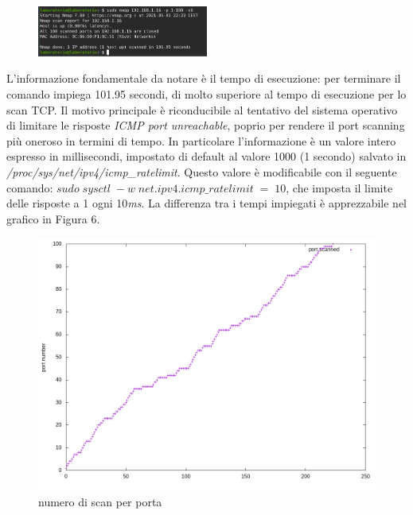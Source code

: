 \documentclass{article}
\begin{document}
\begin{figure} %
  \centering
  \includegraphics[width=0.5\textwidth]{Servizi attivi su vm con udp.png}
\end{figure}

L'informazione fondamentale da notare è il tempo di esecuzione: per terminare
il comando impiega 101.95 secondi, di molto superiore al tempo di esecuzione 
per lo scan TCP. Il motivo principale è riconducibile al tentativo del sistema 
operativo di limitare le risposte \textit{ICMP port unreachable}, poprio per 
rendere il port scanning più oneroso in termini di tempo. In particolare 
l'informazione è un valore intero espresso in millisecondi, impostato di
default al valore 1000 (1 secondo) salvato in \textit{/proc/sys/net/ipv4/icmp\_ratelimit}. Questo valore è modificabile con 
il seguente comando: $sudo\; sysctl\; -w\; net.ipv4.icmp\_ratelimit\;=\;10$, che imposta 
il limite delle risposte a 1 ogni 10\textit{ms}. La differenza tra i 
tempi impiegati è apprezzabile nel grafico in Figura 6. \\

\begin{figure} %
  \centering
  \includegraphics[width=1\linewidth]{vm_udp_num_test.png}  
  \caption{numero di scan per porta}\label{Fig:num2}
\end{figure}
\end{document}
